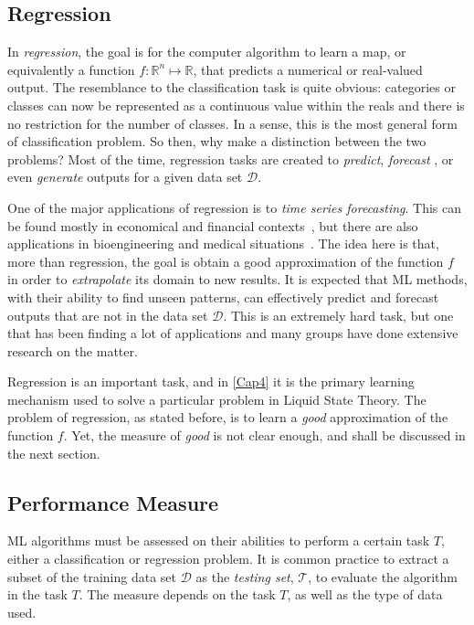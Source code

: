 \subsection{Regression}
In \emph{regression}, the goal is for the computer algorithm to learn a map, or 
equivalently a function $f \colon \mathbb{R}^n \mapsto \mathbb{R}$, that predicts a 
numerical or real-valued output. The resemblance to the classification task is quite 
obvious: categories or classes can now be represented as a continuous value within the 
reals and there is no restriction for the number of classes. In a sense, this is the most 
general form of classification problem. So then, why make a distinction between the two 
problems? Most of the time, regression tasks are created to \emph{predict}, \emph{forecast}
, or even \emph{generate} outputs for a given data set $\mathcal{D}$.

One of the major applications of regression is to \emph{time series forecasting}. This can 
be found mostly in economical and financial contexts~\cite{bontempiMachineLearningStrategies2013,sezerFinancialTimeSeries2020}, but there are also 
applications in bioengineering and medical situations~\cite{mccoyAssessmentTimeSeriesMachine2018}. The idea here is that, more than regression, the 
goal is obtain a good approximation of the function $f$ in order to \emph{extrapolate} its 
domain to new results. It is expected that ML methods, with their ability to find unseen 
patterns, can effectively predict and forecast outputs that are not in the data set 
$\mathcal{D}$. This is an extremely hard task, but one that has been finding a lot of 
applications and many groups have done extensive research on the matter.

Regression is an important task, and in \autoref{Cap4} it is the primary learning mechanism 
used to solve a particular problem in Liquid State Theory. The problem of regression, as 
stated before, is to learn a \emph{good} approximation of the function $f$. Yet, the 
measure of \emph{good} is not clear enough, and shall be discussed in the next section.

\subsection{Performance Measure}
ML algorithms must be assessed on their abilities to perform a certain task $T$, either a 
classification or regression problem. It is common practice to extract a subset of the 
training data set $\mathcal{D}$ as the \emph{testing set}, $\mathcal{T}$, to evaluate the 
algorithm in the task $T$. The measure depends on the task $T$, as well as the type of data 
used.

